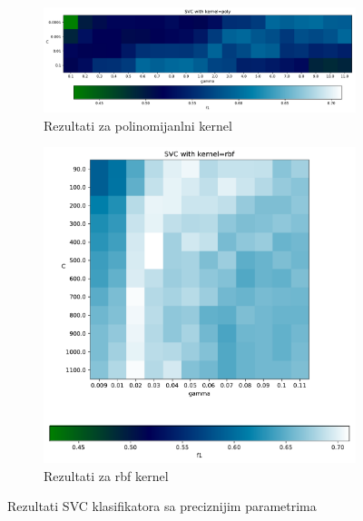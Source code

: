 \documentclass[a4paper]{article}
\begin{document}
\begin{figure}[h!]
	\centering
	\begin{subfigure}{.8\textwidth}
		\includegraphics[width=1\linewidth]{images/SVC_kernel_fine_poly.pdf}
		\caption{Rezultati za polinomijanlni kernel}
		\label{fig:sub-best1}
	\end{subfigure} %

	\begin{subfigure}{.6\textwidth}
		\includegraphics[width=1\linewidth]{images/SVC_kernel_fine_rbf.pdf}
		\caption{Rezultati za rbf kernel}
		\label{fig:sub-best2}
	\end{subfigure}
	\caption{Rezultati SVC klasifikatora sa preciznijim parametrima}
	\label{fig:svc-results-best}
\end{figure}
\end{document}
